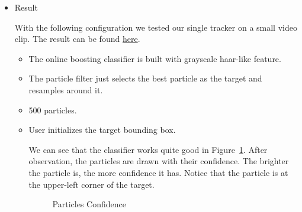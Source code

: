 \documentclass[a4paper]{article}
\begin{document}
\begin{enumerate}
\begin{itemize}
\begin{itemize}
\end{itemize}

\item Result

With the following configuration we tested our single tracker on a small video clip. The result can be found \href{https://zerowong.github.io/PedestrainCounting/results/singleTrackerTestGray01.avi}{here}.

\begin{itemize}

\item The online boosting classifier is built with grayscale haar-like feature.
\item The particle filter just selects the best particle as the target and resamples around it.
\item 500 particles.
\item User initializes the target bounding box.

We can see that the classifier works quite good in Figure~\ref{fig:particlesConfidence}. After observation, the particles are drawn with their confidence. The brighter the particle is, the more confidence it has. Notice that the particle is at the upper-left corner of the target.

\begin{figure}[htb]
    \begin{center}
    \end{center}
    \caption{Particles Confidence}
    \label{fig:particlesConfidence}
\end{figure}


\end{itemize}
\end{itemize}
\end{enumerate}
\end{document}
